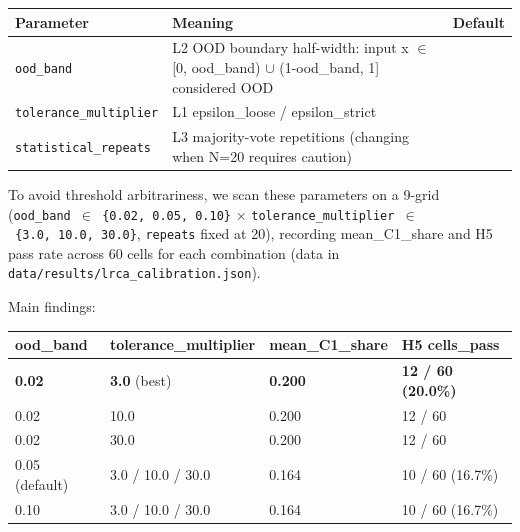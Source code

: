 \documentclass[review,12pt,authoryear]{elsarticle}
\begin{document}
{\def\LTcaptype{none} %
\begin{longtable}[]{@{}
  >{\raggedright\arraybackslash}p{}
  >{\raggedright\arraybackslash}p{}
  >{\raggedright\arraybackslash}p{}@{}}
\toprule\noalign{}
\begin{minipage}[b]{\linewidth}\raggedright
Parameter
\end{minipage} & \begin{minipage}[b]{\linewidth}\raggedright
Meaning
\end{minipage} & \begin{minipage}[b]{\linewidth}\raggedright
Default
\end{minipage} \\
\midrule\noalign{}
\endhead
\bottomrule\noalign{}
\endlastfoot
\texttt{ood\_band} & L2 OOD boundary half-width: input x $\in$ {[}0,
ood\_band) $\cup$ (1-ood\_band, 1{]} considered OOD & 0.05 \\
\texttt{tolerance\_multiplier} & L1 epsilon\_loose / epsilon\_strict &
10.0 \\
\texttt{statistical\_repeats} & L3 majority-vote repetitions (changing
when N=20 requires caution) & 20 \\
\end{longtable}
}

To avoid threshold arbitrariness, we scan these parameters on a 9-grid
(\texttt{ood\_band\ $\in$\ \{0.02,\ 0.05,\ 0.10\}} $\times$
\texttt{tolerance\_multiplier\ $\in$\ \{3.0,\ 10.0,\ 30.0\}},
\texttt{repeats} fixed at 20), recording mean\_C1\_share and H5 pass
rate across 60 cells for each combination (data in
\texttt{data/results/lrca\_calibration.json}).

Main findings:

{\def\LTcaptype{none} %
\begin{longtable}[]{@{}llll@{}}
\toprule\noalign{}
ood\_band & tolerance\_multiplier & mean\_C1\_share & H5 cells\_pass \\
\midrule\noalign{}
\endhead
\bottomrule\noalign{}
\endlastfoot
\textbf{0.02} & \textbf{3.0} (best) & \textbf{0.200} & \textbf{12 / 60
(20.0\%)} \\
0.02 & 10.0 & 0.200 & 12 / 60 \\
0.02 & 30.0 & 0.200 & 12 / 60 \\
0.05 (default) & 3.0 / 10.0 / 30.0 & 0.164 & 10 / 60 (16.7\%) \\
0.10 & 3.0 / 10.0 / 30.0 & 0.164 & 10 / 60 (16.7\%) \\
\end{longtable}
}
\end{document}
